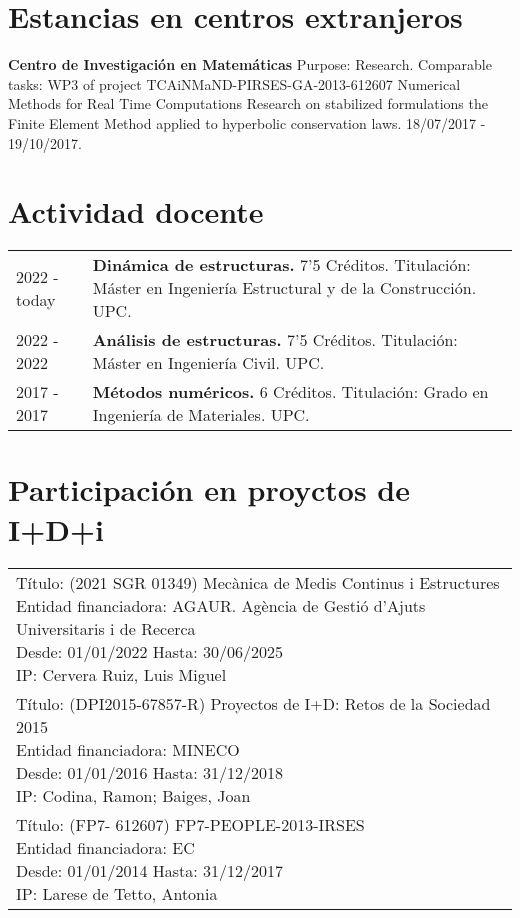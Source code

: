 \documentclass[11pt]{article}
\begin{document}
\section{Estancias en centros extranjeros}
\textbf{Centro de Investigación en Matemáticas} Purpose: Research. Comparable tasks: WP3 of project
TCA\-iNMaND-PIRSES-GA-2013-612607 Numerical Methods for Real Time Computations Research on stabilized
formulations the Finite Element Method applied to hyperbolic conservation laws. 18/07/2017 - 19/10/2017.


\section{Actividad docente}
\begin{tabularx}{\linewidth}{lX}
    2022 - today &
    \textbf{Dinámica de estructuras.} 7'5 Créditos. Titulación: Máster en Ingeniería Estructural y de la Construcción. UPC. \\

    2022 - 2022 &
    \textbf{Análisis de estructuras.} 7'5 Créditos. Titulación: Máster en Ingeniería Civil. UPC. \\

    2017 - 2017 &
    \textbf{Métodos numéricos.} 6 Créditos. Titulación: Grado en Ingeniería de Materiales. UPC. \\
\end{tabularx}


\section{Participación en proyctos de I+D+i}
\begin{tabularx}{\linewidth}{l}
    \parbox{\linewidth}{
        Título: (2021 SGR 01349) Mecànica de Medis Continus i Estructures \\
        Entidad financiadora: AGAUR. Agència de Gestió d'Ajuts Universitaris i de Recerca \\
        Desde: 01/01/2022 Hasta: 30/06/2025 \\
        IP: Cervera Ruiz, Luis Miguel
    } \\ [2.5em]

    \parbox{\linewidth}{
        Título: (DPI2015-67857-R) Proyectos de I+D: Retos de la Sociedad 2015 \\
        Entidad financiadora: MINECO \\
        Desde: 01/01/2016 Hasta: 31/12/2018 \\
        IP: Codina, Ramon; Baiges, Joan
    } \\ [2.5em]

    \parbox{\linewidth}{
        Título: (FP7- 612607) FP7-PEOPLE-2013-IRSES \\
        Entidad financiadora: EC \\
        Desde: 01/01/2014 Hasta: 31/12/2017 \\
        IP: Larese de Tetto, Antonia
    }
\end{tabularx}
\end{document}

